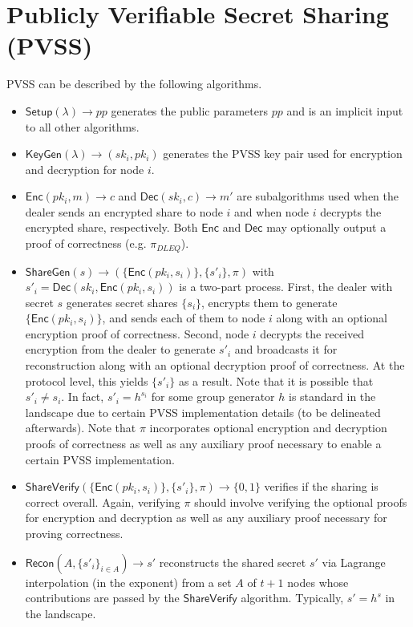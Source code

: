 \documentclass[letterpaper,twocolumn,10pt]{article}
\theoremstyle{definition}
\theoremstyle{remark}
\begin{document}
\section{Publicly Verifiable Secret Sharing (PVSS)}
\label{appendix:pvss}
PVSS can be described by the following algorithms.
\begin{itemize}
    \item $\mathsf{Setup}(\lambda) \rightarrow pp$ generates the public parameters $pp$ and is an implicit input to all other algorithms.
    \item $\mathsf{KeyGen}(\lambda) \rightarrow (sk_i, pk_i)$ generates the PVSS key pair used for encryption and decryption for node $i$.
    \item $\mathsf{Enc}(pk_i, m) \rightarrow c$ and $\mathsf{Dec}(sk_i, c) \rightarrow m'$ are subalgorithms used when the dealer sends an encrypted share to node $i$ and when node $i$ decrypts the encrypted share, respectively. Both $\mathsf{Enc}$ and $\mathsf{Dec}$ may optionally output a proof of correctness (e.g. $\pi_{DLEQ}$).
    \item $\mathsf{ShareGen}(s) \rightarrow (\{\mathsf{Enc}(pk_i, s_i)\}, \{s'_i\}, \pi)$ with $s'_i = \mathsf{Dec}(sk_i, \mathsf{Enc}(pk_i, s_i))$ is a two-part process. First, the dealer with secret $s$ generates secret shares $\{s_i\}$, encrypts them to generate $\{\mathsf{Enc}(pk_i, s_i)\}$, and sends each of them to node $i$ along with an optional encryption proof of correctness. Second, node $i$ decrypts the received encryption from the dealer to generate $s'_i$ and broadcasts it for reconstruction along with an optional decryption proof of correctness. At the protocol level, this yields $\{s'_i\}$ as a result. Note that it is possible that $s'_i \neq s_i$. In fact, $s'_i = h^{s_i}$ for some group generator $h$ is standard in the landscape due to certain PVSS implementation details (to be delineated afterwards). Note that $\pi$ incorporates optional encryption and decryption proofs of correctness as well as any auxiliary proof necessary to enable a certain PVSS implementation.
    \item $\mathsf{ShareVerify}(\{\mathsf{Enc}(pk_i, s_i)\}, \{s'_i\}, \pi) \rightarrow \{0, 1\}$ verifies if the sharing is correct overall. Again, verifying $\pi$ should involve verifying the optional proofs for encryption and decryption as well as any auxiliary proof necessary for proving correctness.
    \item $\mathsf{Recon}(A, \{s'_i\}_{i \in A}) \rightarrow s'$ reconstructs the shared secret $s'$ via Lagrange interpolation (in the exponent) from a set $A$ of $t + 1$ nodes whose contributions are passed by the $\mathsf{ShareVerify}$ algorithm. Typically, $s' = h^s$ in the landscape.
\end{itemize}
\end{document}
